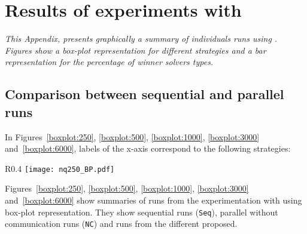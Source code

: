 \chapter{Results of experiments with \nqp}
\label{app:nqp}
\textit{This Appendix, presents graphically a summary of individuals runs using \nqp. Figures show a \textit{box-plot} representation for different strategies and a bar representation for the percentage of winner solvers types.}

\vspace{2ex}\vfill
\minitoc
\newpage

\section{Comparison between sequential and parallel runs}

In Figures~\ref{boxplot:250}, \ref{boxplot:500}, \ref{boxplot:1000}, \ref{boxplot:3000} and~\ref{boxplot:6000}, labels of the x-axis correspond to the following strategies:


\begin{wrapfigure}{R}{0.4\textwidth}
\centering
\texttt{[image: nq250\_BP.pdf]}
\caption{Different communication strategies to solve 250-Queens using \posl}\label{boxplot:250}
\end{wrapfigure}

Figures~\ref{boxplot:250}, \ref{boxplot:500}, \ref{boxplot:1000}, \ref{boxplot:3000} and~\ref{boxplot:6000} show summaries of runs from the experimentation with \nqp{} using box-plot representation. They show sequential runs (\texttt{Seq}), parallel without communication runs (\texttt{NC}) and runs from the different \commstrs{} proposed.

